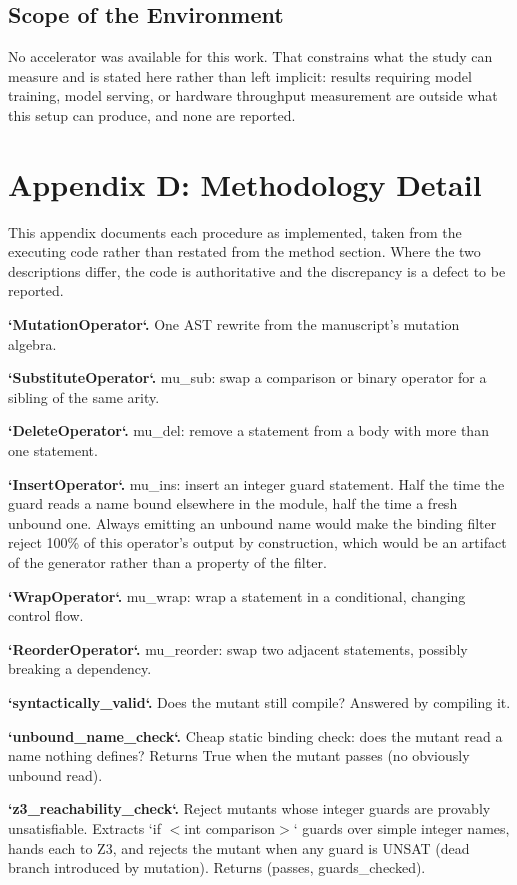 \documentclass[10pt,twocolumn,letterpaper]{article}
\begin{document}
\subsection{Scope of the Environment}


No accelerator was available for this work. That constrains what the study can measure and is stated here rather than left implicit: results requiring model training, model serving, or hardware throughput measurement are outside what this setup can produce, and none are reported.




\section{Appendix D: Methodology Detail}


This appendix documents each procedure as implemented, taken from the executing code rather than restated from the method section. Where the two descriptions differ, the code is authoritative and the discrepancy is a defect to be reported.

\textbf{`MutationOperator`.} One AST rewrite from the manuscript's mutation algebra.

\textbf{`SubstituteOperator`.} mu\_sub: swap a comparison or binary operator for a sibling of the same arity.

\textbf{`DeleteOperator`.} mu\_del: remove a statement from a body with more than one statement.

\textbf{`InsertOperator`.} mu\_ins: insert an integer guard statement. Half the time the guard reads a name bound elsewhere in the module, half the time a fresh unbound one. Always emitting an unbound name would make the binding filter reject 100\% of this operator's output by construction, which would be an artifact of the generator rather than a property of the filter.

\textbf{`WrapOperator`.} mu\_wrap: wrap a statement in a conditional, changing control flow.

\textbf{`ReorderOperator`.} mu\_reorder: swap two adjacent statements, possibly breaking a dependency.

\textbf{`syntactically\_valid`.} Does the mutant still compile? Answered by compiling it.

\textbf{`unbound\_name\_check`.} Cheap static binding check: does the mutant read a name nothing defines? Returns True when the mutant passes (no obviously unbound read).

\textbf{`z3\_reachability\_check`.} Reject mutants whose integer guards are provably unsatisfiable. Extracts `if $<$int comparison$>$` guards over simple integer names, hands each to Z3, and rejects the mutant when any guard is UNSAT (dead branch introduced by mutation). Returns (passes, guards\_checked).
\end{document}
